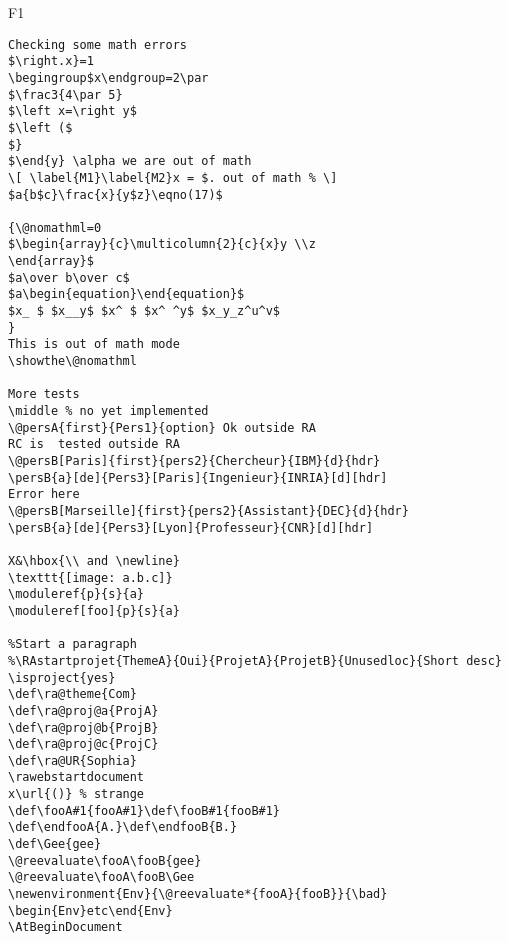 \documentclass{article}
\begin{document}
\begin{filecontents+}{F1}
\begin{Verbatim}
Checking some math errors
$\right.x}=1
\begingroup$x\endgroup=2\par 
$\frac3{4\par 5}
$\left x=\right y$ 
$\left ($ 
$}
$\end{y} \alpha we are out of math
\[ \label{M1}\label{M2}x = $. out of math % \]
$a{b$c}\frac{x}{y$z}\eqno(17)$ 

{\@nomathml=0
$\begin{array}{c}\multicolumn{2}{c}{x}y \\z
\end{array}$
$a\over b\over c$
$a\begin{equation}\end{equation}$
$x_ $ $x__y$ $x^ $ $x^ ^y$ $x_y_z^u^v$
}
This is out of math mode
\showthe\@nomathml

More tests 
\middle % no yet implemented
\@persA{first}{Pers1}{option} Ok outside RA
RC is  tested outside RA
\@persB[Paris]{first}{pers2}{Chercheur}{IBM}{d}{hdr}
\persB{a}[de]{Pers3}[Paris]{Ingenieur}{INRIA}[d][hdr]
Error here
\@persB[Marseille]{first}{pers2}{Assistant}{DEC}{d}{hdr}
\persB{a}[de]{Pers3}[Lyon]{Professeur}{CNR}[d][hdr]

X&\hbox{\\ and \newline}
\texttt{[image: a.b.c]}
\moduleref{p}{s}{a}
\moduleref[foo]{p}{s}{a}

%Start a paragraph
%\RAstartprojet{ThemeA}{Oui}{ProjetA}{ProjetB}{Unusedloc}{Short desc}
\isproject{yes}
\def\ra@theme{Com}
\def\ra@proj@a{ProjA}
\def\ra@proj@b{ProjB}
\def\ra@proj@c{ProjC}
\def\ra@UR{Sophia}
\rawebstartdocument
x\url{()} % strange
\def\fooA#1{fooA#1}\def\fooB#1{fooB#1}
\def\endfooA{A.}\def\endfooB{B.}
\def\Gee{gee}
\@reevaluate\fooA\fooB{gee}
\@reevaluate\fooA\fooB\Gee
\newenvironment{Env}{\@reevaluate*{fooA}{fooB}}{\bad}
\begin{Env}etc\end{Env}
\AtBeginDocument




\end{Verbatim}
\end{filecontents+}
\end{document}
